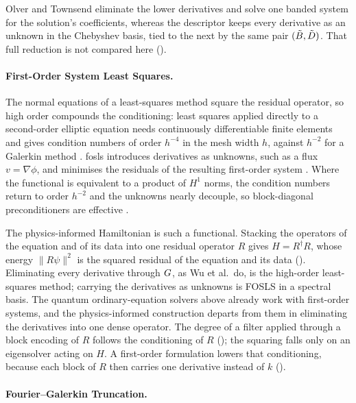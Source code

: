Olver and Townsend eliminate the lower derivatives and solve one banded system for the solution's coefficients, whereas the descriptor keeps every derivative as an unknown in the Chebyshev basis, tied to the next by the same pair $(\tilde{B},\tilde{D})$. That full reduction is not compared here ().

\paragraph{First-Order System Least Squares.}
\label{sec:bg-fosls}

The normal equations of a least-squares method square the residual operator, so high order compounds the conditioning: least squares applied directly to a second-order elliptic equation needs continuously differentiable finite elements and gives condition numbers of order $h^{-4}$ in the mesh width $h$, against $h^{-2}$ for a Galerkin method \cite{bochevgunzburger1998review}. \Gls{fosls} introduces derivatives as unknowns, such as a flux $v=\nabla\phi$, and minimises the residuals of the resulting first-order system \cite{cai1994fosls}. Where the functional is equivalent to a product of $H^1$ norms, the condition numbers return to order $h^{-2}$ and the unknowns nearly decouple, so block-diagonal preconditioners are effective \cite{bochevgunzburger1998review,bochev2009lsfem}.

The physics-informed Hamiltonian is such a functional. Stacking the operators of the equation and of its data into one residual operator $R$ gives $H=R^\dagger R$, whose energy $\|R\psi\|^2$ is the squared residual of the equation and its data (). Eliminating every derivative through $G$, as Wu et al.\ do, is the high-order least-squares method; carrying the derivatives as unknowns is FOSLS in a spectral basis. The quantum ordinary-equation solvers above already work with first-order systems, and the physics-informed construction departs from them in eliminating the derivatives into one dense operator. The degree of a filter applied through a block encoding of $R$ follows the conditioning of $R$ (); the squaring falls only on an eigensolver acting on $H$. A first-order formulation lowers that conditioning, because each block of $R$ then carries one derivative instead of $k$ ().

\paragraph{Fourier--Galerkin Truncation.}
\label{sec:bg-fourier}

